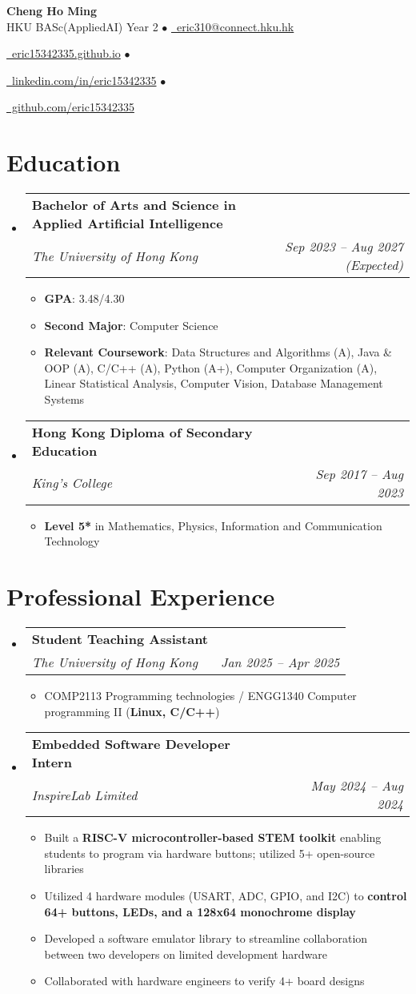 \documentclass[a4paper,11pt]{article}
\makeatletter
\newcommand{\iconlink}[3]{
  \href{#2}{#1~#3}
}
\newcommand{\resumeItem}[1]{
  \item\small{
    {#1}
  }
}
\newcommand{\resumeSubheading}[4]{
  \vspace{-2pt}\item
    \begin{tabular*}{0.97\textwidth}[t]{@{}l@{\extracolsep{\fill}}r@{}}
      \raggedright\textbf{#3} & \small#2 \\ %
      \textit{\small#1} & \textit{\small#4} \\ 
    \end{tabular*}\vspace{-7pt}
}
\newcommand{\resumeSubHeadingListStart}{\begin{itemize}[leftmargin=0.15in, label={}, itemsep=1pt]}
\newcommand{\resumeSubHeadingListEnd}{\end{itemize}}
\newcommand{\resumeItemListStart}{
  \begin{itemize}[
    leftmargin=0.2in,    %
    rightmargin=0.2in,   %
    itemindent=0pt,       %
    labelindent=0pt,      %
    labelsep=0.1in,       %
    itemsep=1pt,          %
    parsep=0pt            %
  ]
}
\newcommand{\resumeItemListEnd}{\end{itemize}}
\newcommand{\contactSep}{\hspace{0.1em}$\bullet$\hspace{0.2em}}
\makeatother
\begin{document}
\begin{center}
    \textbf{\Huge Cheng Ho Ming} \\ \vspace{3pt}
    \small
    HKU BASc(AppliedAI) Year 2 \contactSep \iconlink{\faEnvelope}{mailto:eric310@connect.hku.hk}{eric310@connect.hku.hk} \\ \vspace{3pt}
    \iconlink{\faGlobe}{https://eric15342335.github.io/}{eric15342335.github.io} \contactSep
    \iconlink{\faLinkedin}{https://linkedin.com/in/eric15342335}{linkedin.com/in/eric15342335} \contactSep
    \iconlink{\faGithub}{https://github.com/eric15342335}{github.com/eric15342335}
\end{center}

\section{Education}
  \resumeSubHeadingListStart
    \resumeSubheading
      {The University of Hong Kong}{}
      {Bachelor of Arts and Science in Applied Artificial Intelligence}{Sep 2023 -- Aug 2027 (Expected)}
      \resumeItemListStart
        \resumeItem{\textbf{GPA}: 3.48/4.30}
        \resumeItem{\textbf{Second Major}: Computer Science}
        \resumeItem{\textbf{Relevant Coursework}: Data Structures and Algorithms (A), Java \& OOP (A), C/C++ (A), Python (A+), Computer Organization (A), Linear Statistical Analysis, Computer Vision, Database Management Systems}
      \resumeItemListEnd
    \resumeSubheading
      {King's College}{}
      {Hong Kong Diploma of Secondary Education}{Sep 2017 -- Aug 2023}
      \resumeItemListStart
        \resumeItem{\textbf{Level 5*} in Mathematics, Physics, Information and Communication Technology}
      \resumeItemListEnd
  \resumeSubHeadingListEnd

\section{Professional Experience}
  \resumeSubHeadingListStart
    \resumeSubheading
      {The University of Hong Kong}{}
      {Student Teaching Assistant}{Jan 2025 -- Apr 2025}
      \resumeItemListStart
        \resumeItem{COMP2113 Programming technologies / ENGG1340 Computer programming II (\textbf{Linux, C/C++})}
      \resumeItemListEnd
    \resumeSubheading
      {InspireLab Limited}{}
      {Embedded Software Developer Intern}{May 2024 -- Aug 2024}
      \resumeItemListStart
        \resumeItem{Built a \textbf{RISC-V microcontroller-based STEM toolkit} enabling students to program via hardware buttons; utilized 5+ open-source libraries}
        \resumeItem{Utilized 4 hardware modules (USART, ADC, GPIO, and I2C) to \textbf{control 64+ buttons, LEDs, and a 128x64 monochrome display}}
        \resumeItem{Developed a software emulator library to streamline collaboration between two developers on limited development hardware}
        \resumeItem{Collaborated with hardware engineers to verify 4+ board designs}
      \resumeItemListEnd
  \resumeSubHeadingListEnd
\end{document}
